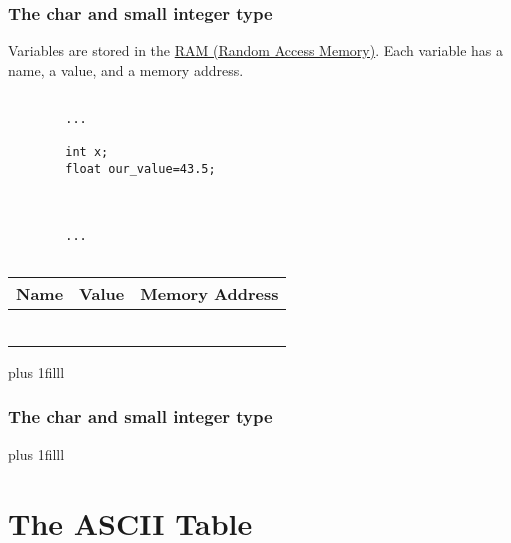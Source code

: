 \documentclass[fleqn]{beamer} %
\newcommand{\sectiontitleII}{The char and small integer type}
\newcommand{\sectiontitleIII}{The ASCII Table}
\newcommand{\btVFill}{\vskip0pt plus 1filll}
\begin{document}
	\begin{frame}[label=sectionII,containsverbatim] \small
	\frametitle{\sectiontitleII}
	
	Variables are stored in the \href{https://en.wikipedia.org/wiki/Random-access_memory}{RAM (Random Access Memory)}. Each variable has a {\BL name}, a {\GR value}, and a {\PR memory address}.  \vspace{5mm}\\
	
	\begin{multicols}{2}
		
		\begin{lstlisting}
		
		...
		
		int x;
		float our_value=43.5;
		
		
		
		...			
		
		\end{lstlisting}
		
		\renewcommand*{\arraystretch}{1.5}
		\begin{tabular}{c|c|c} 
			Name&Value&Memory Address\\ \hline
			& & \\ \hline
			& & \\ \hline
			& & \\ \hline
			& & \\ \hline
			& & \\ \hline
			& & \\ \hline
		\end{tabular}
		
			
		
	\end{multicols}
	
	\btVFill
	
	
\end{frame}

	\begin{frame} \small
		\frametitle{\sectiontitleII}
		
		
		\btVFill
	\end{frame}	


\section{\sectiontitleIII}
\end{document}
